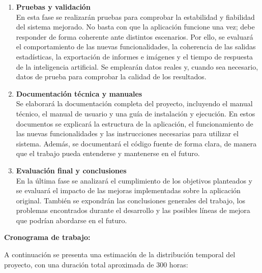 \begin{enumerate}
    \item \textbf{Pruebas y validación} \\
    En esta fase se realizarán pruebas para comprobar la estabilidad y fiabilidad del sistema mejorado. No basta con que la aplicación funcione una vez; debe responder de forma coherente ante distintos escenarios. Por ello, se evaluará el comportamiento de las nuevas funcionalidades, la coherencia de las salidas estadísticas, la exportación de informes e imágenes y el tiempo de respuesta de la inteligencia artificial. Se emplearán datos reales y, cuando sea necesario, datos de prueba para comprobar la calidad de los resultados.
    
    \item \textbf{Documentación técnica y manuales} \\
    Se elaborará la documentación completa del proyecto, incluyendo el manual técnico, el manual de usuario y una guía de instalación y ejecución. En estos documentos se explicará la estructura de la aplicación, el funcionamiento de las nuevas funcionalidades y las instrucciones necesarias para utilizar el sistema. Además, se documentará el código fuente de forma clara, de manera que el trabajo pueda entenderse y mantenerse en el futuro.
    
    \item \textbf{Evaluación final y conclusiones} \\
    En la última fase se analizará el cumplimiento de los objetivos planteados y se evaluará el impacto de las mejoras implementadas sobre la aplicación original. También se expondrán las conclusiones generales del trabajo, los problemas encontrados durante el desarrollo y las posibles líneas de mejora que podrían abordarse en el futuro.
\end{enumerate}

\newpage

\textbf{Cronograma de trabajo:}

A continuación se presenta una estimación de la distribución temporal del proyecto, con una duración total aproximada de 300 horas:


